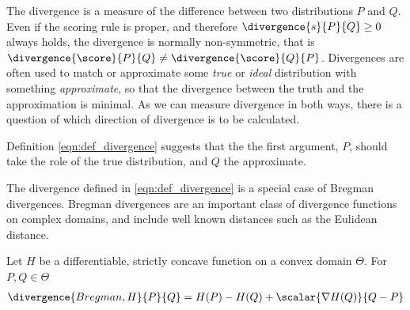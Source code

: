 The divergence is a measure of the difference between two distributions $P$ and $Q$. Even if the scoring rule is proper, and therefore $\divergence{s}{P}{Q} \geq 0$ always holds, the divergence is normally non-symmetric, that is $\divergence{\score}{P}{Q} \neq \divergence{\score}{Q}{P}$. Divergences are often used to match or approximate some \emph{true} or \emph{ideal} distribution with something \emph{approximate}, so that the divergence between the truth and the approximation is minimal. As we can measure divergence in both ways, there is a question of which direction of divergence is to be calculated.

Definition \eqref{eqn:def_divergence} suggests that the the first argument, $P$, should take the role of the true distribution, and $Q$ the approximate. 

The divergence defined in \eqref{eqn:def_divergence} is a special case of Bregman divergences. Bregman divergences are an important class of divergence functions on complex domains, and include well known distances such as the Eulidean distance.

\begin{definition}
	Let $H$ be a differentiable, strictly concave function on a convex domain $\Theta$. For $P,Q\in\Theta$ 
	\begin{align}
		\divergence{Bregman,H}{P}{Q} = H(P) - H(Q) + \scalar{\nabla H(Q)}{Q-P}
	\end{align}
\end{definition}

